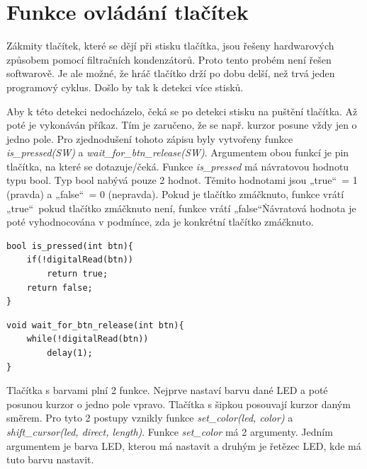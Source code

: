 \section{Funkce ovládání tlačítek}
Zákmity tlačítek, které se dějí při stisku tlačítka, jsou řešeny hardwarových způsobem pomocí filtračních kondenzátorů. Proto tento probém
není řešen softwarově. Je ale možné, že hráč tlačítko drží po dobu delší, než trvá jeden programový cyklus. Došlo by tak k detekci více stisků.

Aby k této detekci nedocházelo, čeká se po detekci stisku na puštění tlačítka. Až poté je vykonáván příkaz. Tím je zaručeno, že se 
např. kurzor posune vždy jen o jedno pole. Pro zjednodušení tohoto zápisu byly vytvořeny funkce {\it is\_pressed(SW)} a {\it wait\_for\_btn\_release(SW)}.
Argumentem obou funkcí je pin tlačítka, na které se dotazuje/čeká. Funkce {\it is\_pressed} má návratovou hodnotu typu bool. Typ bool nabývá pouze 2 hodnot.
Těmito hodnotami jsou „true“\ = 1 (pravda) a „false“\ = 0 (nepravda). Pokud je tlačítko zmáčknuto, funkce vrátí „true“\, pokud tlačítko zmáčknuto není, 
funkce vrátí „false“\. Návratová hodnota je poté vyhodnocována v podmínce, zda je konkrétní tlačítko zmáčknuto. 

\begin{minipage}{\linewidth}
\begin{lstlisting}[frame=single,numbers=right,caption={Funkce pro detekci stisku tlačítka.},label=lst:priklad.vypis.kodu.C,basicstyle=\ttfamily\small, keywordstyle=\color{black}\bfseries\underbar,]
bool is_pressed(int btn){
    if(!digitalRead(btn))
        return true;
    return false;
}
\end{lstlisting}
\end{minipage}

\begin{minipage}{\linewidth}
\begin{lstlisting}[frame=single,numbers=right,caption={Funkce čekající na puštění tlačítka.},label=lst:priklad.vypis.kodu.C,basicstyle=\ttfamily\small, keywordstyle=\color{black}\bfseries\underbar,]
void wait_for_btn_release(int btn){
    while(!digitalRead(btn))
        delay(1);
}
\end{lstlisting}
\end{minipage} 

Tlačítka s barvami plní 2 funkce. Nejprve nastaví barvu dané LED a poté posunou kurzor o jedno pole vpravo. Tlačítka s šipkou posouvají kurzor daným směrem. 
Pro tyto 2 postupy vznikly funkce {\it set\_color(led, color)} a {\it shift\_cursor(led, direct, length)}.
Funkce {\it set\_color} má 2 argumenty. Jedním argumentem je barva LED, kterou má nastavit a druhým je řetězec LED, kde má tuto barvu nastavit.


